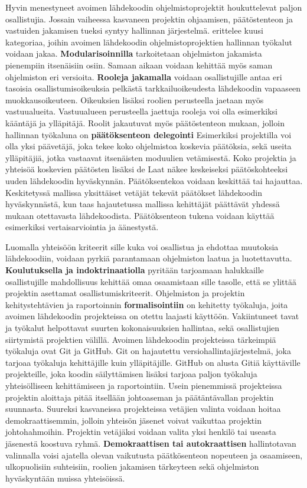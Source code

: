 \documentclass[utf8]{gradu3}
\begin{document}
Hyvin menestyneet avoimen lähdekoodin ohjelmistoprojektit houkuttelevat paljon
osallistujia. Jossain vaiheessa kasvaneen projektin ohjaamisen, päätöstenteon ja
vastuiden jakamisen tueksi syntyy hallinnan järjestelmä. %
\textcite{Laat-2007} erittelee kuusi kategoriaa, joihin avoimen lähdekoodin
ohjelmistoprojektien hallinnan työkalut voidaan jakaa.%
\textbf{Modularisoinnilla} tarkoitetaan ohjelmiston jakamista pienempiin
itsenäisiin osiin. Samaan aikaan voidaan kehittää myös saman ohjelmiston eri
versioita.%
\textbf{Rooleja jakamalla} voidaan osallistujille antaa eri tasoisia
osallistumisoikeuksia pelkästä tarkkailuoikeudesta lähdekoodin vapaaseen
muokkausoikeuteen. Oikeuksien lisäksi roolien perusteella jaetaan myös
vastuualueita. Vastuualueen perusteella jaettuja rooleja voi olla esimerkiksi
kääntäjä ja ylläpitäjä.%
Roolit jakautuvat myös päätöstenteon mukaan, jolloin hallinnan työkaluna on
\textbf{päätöksenteon delegointi} Esimerkiksi projektilla voi olla yksi
päävetäjä, joka tekee koko ohjelmistoa koskevia päätöksia, sekä useita
ylläpitäjiä, jotka vastaavat itsenäisten moduulien vetämisestä. Koko projektia
ja yhteisöä koskevien päätösten lisäksi de Laat näkee keskeiseksi
päätöskohteeksi uuden lähdekoodin hyväskynnän. Päätöksentekoa voidaan keskittää
tai hajauttaa. Keskitetyssä mallissa yksittäiset vetäjät tekevät päätökset
lähdekoodin hyväskynnästä, kun taas hajautetussa mallissa kehittäjät päättävät
yhdessä mukaan otettavasta lähdekoodista. Päätöksenteon tukena voidaan käyttää
esimerkiksi vertaisarviointia ja äänestystä.%

Luomalla yhteisöön kriteerit sille kuka voi osallistua ja ehdottaa muutoksia
lähdekoodiin, voidaan pyrkiä parantamaan ohjelmiston laatua ja luotettavutta.
\textbf{Koulutuksella ja indoktrinaatiolla} pyritään tarjoamaan halukkaille
osallistujille mahdollisuus kehittää omaa osaamistaan sille tasolle, että se
ylittää projektin asettamat osallistumiskriteerit.%
Ohjelmiston ja projektin kehitystehtävien ja raportoinnin
\textbf{formalisointiin} on kehitetty työkaluja, joita avoimen lähdekoodin
projekteissa on otettu laajasti käyttöön. Vakiintuneet tavat ja työkalut
helpottavat suurten kokonaisuuksien hallintaa, sekä osallistujien siirtymistä
projektien välillä. Avoimen lähdekoodin projekteissa tärkeimpiä työkaluja ovat
Git ja GitHub. Git on hajautettu versiohallintajärjestelmä, joka tarjoaa
työkaluja kehittäjille kuin ylläpitäjille. GitHub on alusta Gitiä käyttäville
projekteille, joka koodin säilyttämisen lisäksi tarjoaa paljon työkaluja
yhteisölliseen kehittämiseen ja raportointiin.%
Usein pienemmissä projekteissa projektin aloittaja pitää itsellään johtoaseman
ja päätäntävallan projektin suunnasta. Suureksi kasvaneissa projekteissa
vetäjien valinta voidaan hoitaa demokraattisemmin, jolloin yhteisön jäsenet
voivat vaikuttaa projektin johtohahmoihin. Projektin vetäjäksi voidaan valita
yksi henkilö tai useasta jäsenestä koostuva ryhmä. \textbf{Demokraattisen tai
autokraattisen} hallintotavan valinnalla voisi ajatella olevan vaikutusta
päätkösenteon nopeuteen ja osaamiseen, ulkopuolisiin suhteisiin, roolien
jakamisen tärkeyteen sekä ohjelmiston hyväskyntään muissa yhteisöissä.%
\end{document}
